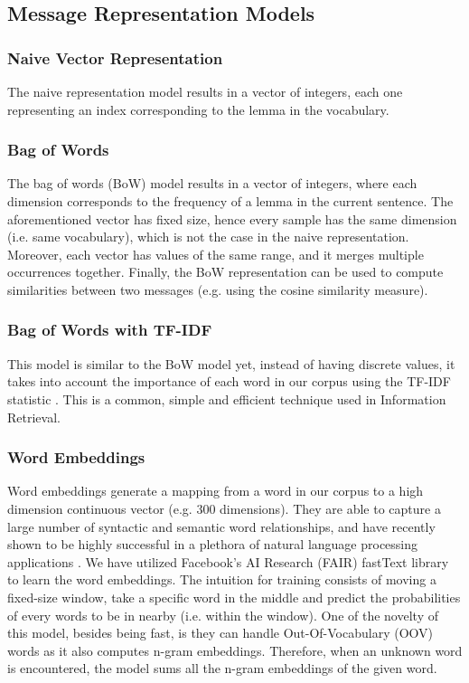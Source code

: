 \documentclass[letterpaper]{article}
\begin{document}
\subsection{Message Representation Models}  \label{Representation}

\subsubsection{Naive Vector Representation}  \label{Naive Vector Representation}

The naive representation model results in a vector of integers, each one representing an index corresponding to the lemma in the vocabulary.

\subsubsection{Bag of Words}  \label{Bag of Words}

The bag of words (BoW) model results in a vector of integers, where each dimension corresponds to the frequency of a lemma in the current sentence. The aforementioned vector has fixed size, hence every sample has the same dimension (i.e. same vocabulary), which is not the case in the naive representation. Moreover, each vector has values of the same range, and it merges multiple occurrences together. Finally, the BoW representation can be used to compute similarities between two messages (e.g. using the cosine similarity measure).

\subsubsection{Bag of Words with TF-IDF}  \label{TFIDF}

This model is similar to the BoW model yet, instead of having discrete values, it takes into account the importance of each word in our corpus using the TF-IDF statistic \cite{salton1988term}. This is a common, simple and efficient technique used in Information Retrieval.

\subsubsection{Word Embeddings}  \label{Word Embeddings}

Word embeddings generate a mapping from a word in our corpus to a high dimension continuous vector (e.g. $300$ dimensions). They are able to capture a large number of syntactic and semantic word relationships, and have recently shown to be highly successful in a plethora of natural language processing applications \cite{mikolov2013distributed} \cite{bojanowski2016enriching}. We have utilized Facebook's AI Research (FAIR) fastText library \cite{bojanowski2016enriching} to learn the word embeddings. The intuition for training consists of moving a fixed-size window, take a specific word in the middle and predict the probabilities of every words to be in nearby (i.e. within the window). One of the novelty of this model, besides being fast, is they can handle Out-Of-Vocabulary (OOV) words as it also computes n-gram embeddings. Therefore, when an unknown word is encountered, the model sums all the n-gram embeddings of the given word.
\end{document}
